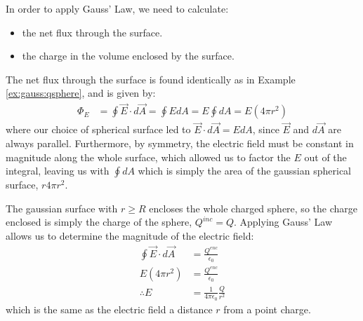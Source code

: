 \begin{example}
In order to apply Gauss' Law, we need to calculate:
\begin{itemize}
\item the net flux through the surface.
\item the charge in the volume enclosed by the surface. 
\end{itemize}
The net flux through the surface is found identically as in Example \ref{ex:gauss:qsphere}, and is given by:
\begin{align*}
\Phi_E&=\oint \vec E\cdot d\vec A=\oint E dA= E\oint dA=E(4\pi r^2)
\end{align*}
where our choice of spherical surface led to $\vec E\cdot d\vec A=EdA$, since $\vec E$ and $d\vec A$ are always parallel. Furthermore, by symmetry, the electric field must be constant in magnitude along the whole surface, which allowed us to factor the $E$ out of the integral, leaving us with $\oint dA$ which is simply the area of the gaussian spherical surface, $r4\pi r^2$.

The gaussian surface with $r\geq R$ encloses the whole charged sphere, so the charge enclosed is simply the charge of the sphere, $Q^{inc}=Q$. Applying Gauss' Law allows us to determine the magnitude of the electric field:
\begin{align*}
\oint \vec E\cdot d\vec A&=\frac{Q^{enc}}{\epsilon_0} \\
E(4\pi r^2) &= \frac{Q^{enc}}{\epsilon_0}\\
\therefore E&= \frac{1}{4\pi\epsilon_0}\frac{Q}{r^2}
\end{align*}
which is the same as the electric field a distance $r$ from a point charge. 


\end{example}
